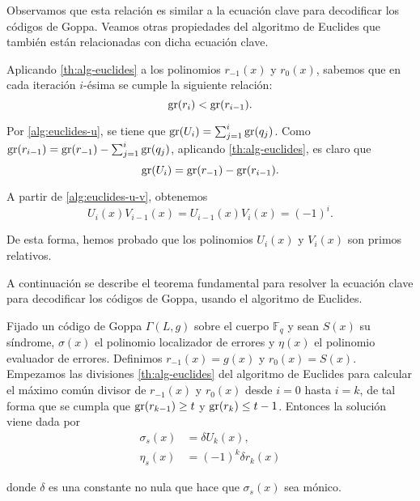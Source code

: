 Observamos que esta relación es similar a la ecuación clave para decodificar los códigos de Goppa. Veamos otras propiedades del algoritmo de Euclides que también están relacionadas con dicha ecuación clave.

Aplicando \ref{th:alg-euclides} a los polinomios $r_{-1}(x)$ y $r_0(x)$, sabemos que en cada iteración $i$-ésima se cumple la siguiente relación:
\begin{equation}
    \label{prop:euclides-grados}
    \operatorname{gr}(r_i) < \operatorname{gr}(r_{i-1}).
\end{equation}

Por \eqref{alg:euclides-u}, se tiene que $\operatorname{gr}(U_i) = \sum_{j=1}^i \operatorname{gr}(q_j)$. Como $\operatorname{gr}(r_{i-1}) = \operatorname{gr}(r_{-1}) - \sum_{j=1}^i \operatorname{gr}(q_j)$, aplicando \ref{th:alg-euclides}, es claro que
\begin{equation}
    \label{prop:euclides-grado-u}
    \operatorname{gr}(U_i) = \operatorname{gr}(r_{-1}) - \operatorname{gr}(r_{i-1}).
\end{equation}

A partir de \eqref{alg:euclides-u-v}, obtenemos
\begin{equation}
    \label{prop:euclides-primos-rel}
    U_i(x) V_{i-1}(x) = U_{i-1}(x) V_i(x) = (-1)^i.
\end{equation}

De esta forma, hemos probado que los polinomios $U_i(x)$ y $V_i(x)$ son primos relativos.

A continuación se describe el teorema fundamental para resolver la ecuación clave para decodificar los códigos de Goppa, usando el algoritmo de Euclides.

\begin{theorem}
    \label{th:alg-Sugiyama}
    Fijado un código de Goppa $\Gamma(L, g)$ sobre el cuerpo $\mathbb{F}_q$ y sean $S(x)$ su síndrome, $\sigma(x)$ el polinomio localizador de errores y $\eta(x)$ el polinomio evaluador de errores. Definimos $r_{-1}(x) = g(x)$ y $r_0(x) = S(x)$. Empezamos las divisiones \ref{th:alg-euclides} del algoritmo de Euclides para calcular el máximo común divisor de $r_{-1}(x)$ y $r_0(x)$ desde $i = 0$ hasta $i = k$, de tal forma que se cumpla que $\operatorname{gr}(r_{k-1}) \geq t$ y $\operatorname{gr}(r_k) \leq t - 1$. Entonces la solución viene dada por
    \begin{equation}
        \label{th:sol-Goppa}
        \begin{split}
            \sigma_s(x) &= \delta U_k (x), \\
            \eta_s(x) &= (-1)^k \delta r_k(x)
        \end{split}
    \end{equation}

    donde $\delta$ es una constante no nula que hace que $\sigma_s(x)$ sea mónico.
\end{theorem}

